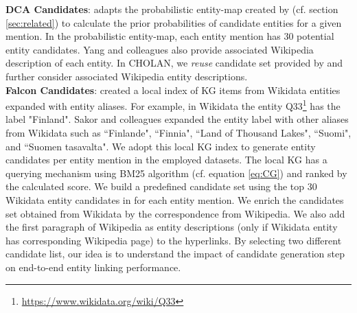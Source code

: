 \documentclass[11pt,a4paper]{article}
\begin{document}
\textbf{DCA Candidates}: \cite{yang2019learning} adapts the probabilistic entity-map  created by \cite{ganea2017deep} (cf. section \ref{sec:related}) to calculate the prior probabilities 
of candidate entities for a given mention. In the probabilistic entity-map, each entity mention has 30 potential entity candidates.
Yang and colleagues also provide associated Wikipedia description of each entity. In CHOLAN, we \textit{reuse} candidate set  provided by \cite{yang2019learning} and further consider associated Wikipedia entity descriptions.\\
\textbf{Falcon Candidates}: \cite{DBLP:conf/naacl/SakorMSSV0A19} created a local index of KG items from Wikidata entities expanded with entity aliases. For example, in Wikidata the entity Q33\footnote{\url{https://www.wikidata.org/wiki/Q33}} has the label "Finland". Sakor and colleagues expanded the entity label with other aliases from Wikidata such as ``Finlande", ``Finnia", ``Land of Thousand Lakes", ``Suomi", and ``Suomen tasavalta". We adopt this local KG index to generate entity candidates per entity mention in the employed datasets.  The local KG has a querying mechanism using BM25 algorithm (cf. equation \eqref{eq:CG}) and ranked by the calculated score. We build a predefined candidate set using the top 30 Wikidata entity candidates in  for each entity mention. 
We enrich the candidates set obtained from Wikidata by the correspondence from Wikipedia.
We also add the first paragraph of Wikipedia as entity descriptions (only if Wikidata entity has corresponding Wikipedia page) to the hyperlinks. By selecting two different candidate list, our idea is to understand the impact of candidate generation step on end-to-end entity linking performance.
\end{document}
